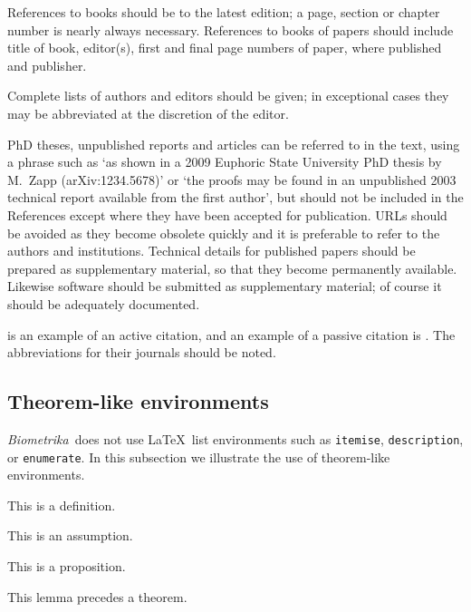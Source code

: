 \documentclass[lineno]{biometrika}
\def\Bka{{\it Biometrika}}
\begin{document}
References to books should be to the latest edition; a page, section or chapter number
is nearly always necessary. References to books of papers should include title of book,
editor(s), first and final page numbers of paper, where published and publisher.

Complete lists of authors and editors should be given; in exceptional cases they may be abbreviated at the discretion of the editor.

PhD theses, unpublished reports and articles can be referred to in the text, using a phrase such as `as shown in a 2009 Euphoric State University PhD thesis by M.~Zapp (arXiv:1234.5678)' or `the proofs may be found in an unpublished 2003 technical report available from the first author', but should not be included in the References except where they have been accepted for publication. URLs should be avoided as they become obsolete quickly and it is preferable to refer to the authors and institutions.  Technical details for published papers should be prepared as supplementary material, so that they become permanently available. Likewise software should be submitted as supplementary material; of course it should be adequately documented.

\citet{Cox:1972} is an example of an active citation, and an example of a passive citation is  \citep{Hear:Holm:Step:quan:2006}.  The abbreviations for their journals should be noted.

\subsection{Theorem-like environments}

\Bka\ does not use \LaTeX\ list environments such as \texttt{itemise}, \texttt{description}, or \texttt{enumerate}.
In this subsection we illustrate the use of theorem-like environments.

\begin{definition}
This is a definition.
\end{definition}

\begin{assumption}
\label{assumptionA}
This is an assumption.
\end{assumption}

\begin{proposition}
This is a proposition.
\end{proposition}

\begin{lemma}
\label{lemma1}
This lemma precedes a theorem.
\end{lemma}
\end{document}

